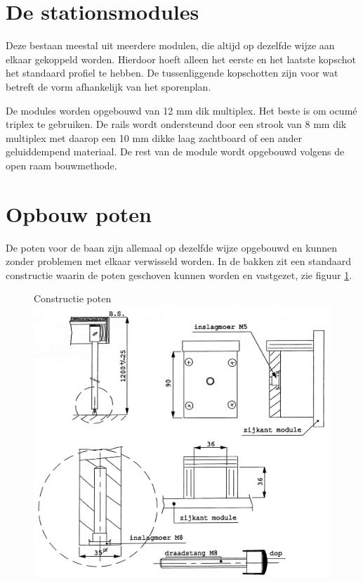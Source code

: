 \documentclass[12pt,a4paper]{report}
\begin{document}
\section{De stationsmodules}
Deze bestaan meestal uit meerdere modulen, die altijd op dezelfde wijze aan elkaar gekoppeld worden. Hierdoor hoeft alleen het eerste en het laatste kopschot het standaard profiel te hebben. De tussenliggende kopschotten zijn voor wat betreft de vorm afhankelijk van het sporenplan.

De modules worden opgebouwd van 12 mm dik multiplex. Het beste is om ocum\'{e} triplex te gebruiken. De rails wordt ondersteund door een strook van 8 mm dik multiplex met daarop een 10 mm dikke laag zachtboard of een ander geluiddempend materiaal.
De rest van de module wordt opgebouwd volgens de open raam bouwmethode.

\section{Opbouw poten}
\label{se:poten}
De poten voor de baan zijn allemaal op dezelfde wijze opgebouwd en kunnen zonder problemen met elkaar verwisseld worden. In de bakken zit een standaard constructie waarin de poten geschoven kunnen worden en vastgezet, zie figuur \ref{figuur2}.

\begin{figure}[!ht]
  \captionbox
  {Constructie poten\label{figuur2}}
  {\includegraphics[scale=0.2]{images/rcu_figuur2}}
\end{figure}
\end{document}
